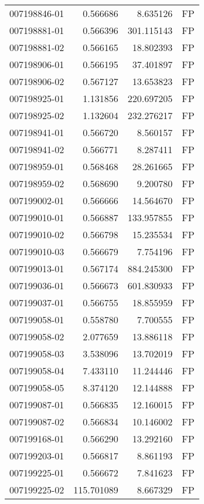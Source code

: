 \begin{tabular}{lrrl}
007198846-01 &    0.566686 &     8.635126 &   FP \\
007198881-01 &    0.566396 &   301.115143 &   FP \\
007198881-02 &    0.566165 &    18.802393 &   FP \\
007198906-01 &    0.566195 &    37.401897 &   FP \\
007198906-02 &    0.567127 &    13.653823 &   FP \\
007198925-01 &    1.131856 &   220.697205 &   FP \\
007198925-02 &    1.132604 &   232.276217 &   FP \\
007198941-01 &    0.566720 &     8.560157 &   FP \\
007198941-02 &    0.566771 &     8.287411 &   FP \\
007198959-01 &    0.568468 &    28.261665 &   FP \\
007198959-02 &    0.568690 &     9.200780 &   FP \\
007199002-01 &    0.566666 &    14.564670 &   FP \\
007199010-01 &    0.566887 &   133.957855 &   FP \\
007199010-02 &    0.566798 &    15.235534 &   FP \\
007199010-03 &    0.566679 &     7.754196 &   FP \\
007199013-01 &    0.567174 &   884.245300 &   FP \\
007199036-01 &    0.566673 &   601.830933 &   FP \\
007199037-01 &    0.566755 &    18.855959 &   FP \\
007199058-01 &    0.558780 &     7.700555 &   FP \\
007199058-02 &    2.077659 &    13.886118 &   FP \\
007199058-03 &    3.538096 &    13.702019 &   FP \\
007199058-04 &    7.433110 &    11.244446 &   FP \\
007199058-05 &    8.374120 &    12.144888 &   FP \\
007199087-01 &    0.566835 &    12.160015 &   FP \\
007199087-02 &    0.566834 &    10.146002 &   FP \\
007199168-01 &    0.566290 &    13.292160 &   FP \\
007199203-01 &    0.566817 &     8.861193 &   FP \\
007199225-01 &    0.566672 &     7.841623 &   FP \\
007199225-02 &  115.701089 &     8.667329 &   FP \\

\end{tabular}
